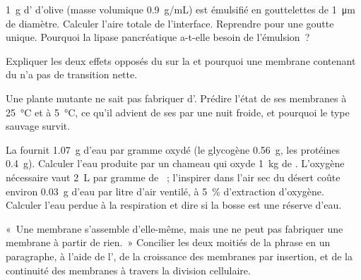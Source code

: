 \begin{exercise}[$\star\star$]\label{exo:b1:lipids:8}
\qty{1}{g} d' d'olive (masse volumique \qty{0.9}{g/mL}) est
émulsifié en gouttelettes de \qty{1}{\micro m} de diamètre. Calculer
l'aire totale de l'interface. Reprendre pour une goutte unique.
Pourquoi la lipase pancréatique a-t-elle besoin de l'émulsion~?
\end{exercise}

\begin{exercise}[$\star\star$]\label{exo:b1:lipids:9}
Expliquer les deux effets opposés du  sur la  et pourquoi une membrane contenant du  n'a pas de
transition nette.
\end{exercise}

\begin{exercise}[$\star\star\star$]\label{exo:b1:lipids:10}
Une plante mutante ne sait pas fabriquer d'.
Prédire l'état de ses membranes à \qty{25}{\celsius} et à
\qty{5}{\celsius}, ce qu'il advient de ses  par une nuit froide,
et pourquoi le type sauvage survit.
\end{exercise}

\begin{exercise}[$\star\star\star$]\label{exo:b1:lipids:11}
La  fournit \qty{1.07}{g} d'eau par gramme oxydé (le glycogène
\qty{0.56}{g}, les protéines \qty{0.4}{g}). Calculer l'eau produite par
un chameau qui oxyde \qty{1}{kg} de . L'oxygène nécessaire vaut
\qty{2}{L} par gramme de ~; l'inspirer dans l'air sec du désert
coûte environ \qty{0.03}{g} d'eau par litre d'air ventilé, à \qty{5}{\%}
d'extraction d'oxygène. Calculer l'eau perdue à la respiration et dire
si la bosse est une réserve d'eau.
\end{exercise}

\begin{exercise}[$\star\star\star$]\label{exo:b1:lipids:12}
«~Une membrane s'assemble d'elle-même, mais une  ne peut pas
fabriquer une membrane à partir de rien.~» Concilier les deux moitiés de
la phrase en un paragraphe, à l'aide de l', de la
croissance des membranes par insertion, et de la continuité des
membranes à travers la division cellulaire.
\end{exercise}


